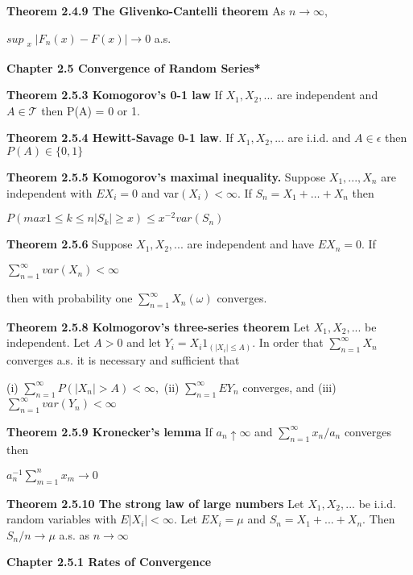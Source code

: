 \documentclass{article}
\newcommand\tab[1][1cm]{\hspace*{#1}}
\begin{document}
\textbf {Theorem 2.4.9 The Glivenko-Cantelli theorem} As $n \rightarrow \infty$,
\begin{center}
$sup_{\substack{x}} |F_n(x) - F(x)| \rightarrow 0$ \tab a.s.
\end{center}

\textbf {Chapter 2.5 Convergence of Random Series*}

\textbf {Theorem 2.5.3 Komogorov's 0-1 law} If $X_1 , X_2 ,...$ are independent and $A \in \mathcal{T}$ then P(A) = 0 or 1.

\textbf {Theorem 2.5.4 Hewitt-Savage 0-1 law}. If $X_1 , X_2 ,...$ are i.i.d. and $A \in \epsilon$ then $P(A) \in \{0,1\}$

\textbf {Theorem 2.5.5 Komogorov's maximal inequality.} Suppose $X_1 ,..., X_n$ are independent with $EX_i = 0$ and var$(X_i) < \infty$. If $S_n = X_1 + \dots + X_n$ then
\begin{center}
$P(max{1 \leq k \leq n} |S_k| \geq x ) \leq x^{-2} var(S_n)$
\end{center}

\textbf {Theorem 2.5.6} Suppose $X_1 , X_2 ,...$ are independent and have $EX_n = 0$. If 
\begin{center}
$\sum_{n=1}^\infty var(X_n) < \infty$
\end{center}
then with probability one $\sum_{n=1}^\infty X_n (\omega)$ converges.

\textbf {Theorem 2.5.8 Kolmogorov's three-series theorem} Let $X_1 , X_2 ,...$ be independent. Let $A > 0$ and let $Y_i = X_i 1_{(|X_i| \leq A)}.$ \tab In order that $\sum_{n=1}^\infty X_n$ converges a.s. it is necessary and sufficient that
\begin{center}
(i) $\sum_{n=1}^\infty P(|X_n| > A) < \infty,$ (ii) $\sum_{n = 1}^\infty EY_n$ converges, and (iii) $\sum_{n=1}^\infty var(Y_n) < \infty$
\end{center} 

\textbf {Theorem 2.5.9 Kronecker's lemma} If $a_n \uparrow \infty$ and $\sum_{n=1}^\infty x_n / a_n$ converges then
\begin{center}
$a_n^{-1} \sum_{m=1}^n x_m \rightarrow 0$
\end{center}

\textbf {Theorem 2.5.10 The strong law of large numbers} Let $X_1 , X_2 ,...$ be i.i.d. random variables with $E|X_i| < \infty$. Let $EX_i = \mu$ and $S_n = X_1 + ... + X_n$. Then $S_n / n \rightarrow \mu$ a.s. as $n \rightarrow \infty$

\textbf {Chapter 2.5.1 Rates of Convergence}
\end{document}

